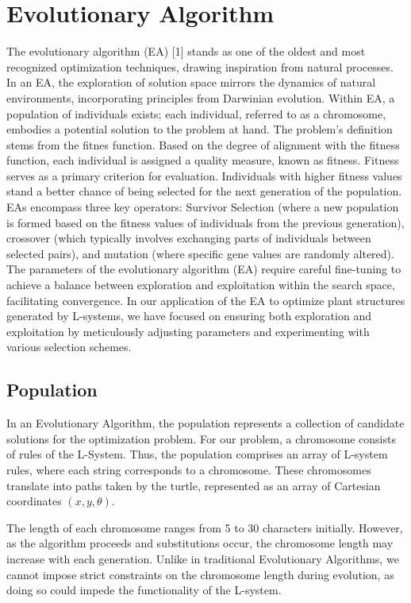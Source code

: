 \section{Evolutionary Algorithm}
The evolutionary algorithm (EA) [1] stands as one of the oldest and most recognized optimization techniques, drawing inspiration from natural processes. In an EA, the exploration of solution space mirrors the dynamics of natural environments, incorporating principles from Darwinian evolution\cite{slowik2020evolutionary}. Within EA, a population of individuals exists; each individual, referred to as a chromosome, embodies a potential solution to the problem at hand. The problem's definition stems from the fitnes function. Based on the degree of alignment with the fitness function, each individual is assigned a quality measure, known as fitness. Fitness serves as a primary criterion for evaluation. Individuals with higher fitness values stand a better chance of being selected for the next generation of the population. EAs encompass three key operators: Survivor Selection (where a new population is formed based on the fitness values of individuals from the previous generation), crossover (which typically involves exchanging parts of individuals between selected pairs), and mutation (where specific gene values are randomly altered). The parameters of the evolutionary algorithm (EA) require careful fine-tuning to achieve a balance between exploration and exploitation within the search space, facilitating convergence. In our application of the EA to optimize plant structures generated by L-systems, we have focused on ensuring both exploration and exploitation by meticulously adjusting parameters and experimenting with various selection schemes.
\subsection{Population}

In an Evolutionary Algorithm, the population represents a collection of candidate solutions for the optimization problem. For our problem, a chromosome consists of rules of the L-System. Thus, the population comprises an array of L-system rules, where each string corresponds to a chromosome. These chromosomes translate into paths taken by the turtle, represented as an array of Cartesian coordinates $(x, y, \theta)$.

The length of each chromosome ranges from 5 to 30 characters initially. However, as the algorithm proceeds and substitutions occur, the chromosome length may increase with each generation. Unlike in traditional Evolutionary Algorithms, we cannot impose strict constraints on the chromosome length during evolution, as doing so could impede the functionality of the L-system.


